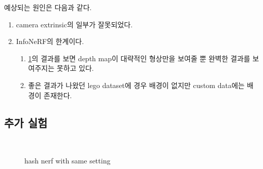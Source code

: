 \documentclass{vipweekly}
\begin{document}
\newpage

예상되는 원인은 다음과 같다.
\begin{enumerate}
    \item camera extrinsic의 일부가 잘못되었다.
    \item InfoNeRF의 한계이다. 
    \begin{enumerate}
        \item \ref{fig:Infonerf}의 결과를 보면 depth map이 대략적인 형상만을 보여줄 뿐 완벽한 결과를 보여주지는 못하고 있다.
        \item 좋은 결과가 나왔던 lego dataset에 경우 배경이 없지만 custom data에는 배경이 존재한다.
    \end{enumerate}
\end{enumerate}


\subsection{추가 실험}

\begin{figure}[h]
    \centering
    \hfill\\
    \caption{hash nerf with same setting}
    \label{fig:Infonerf}
\end{figure}
\end{document}
